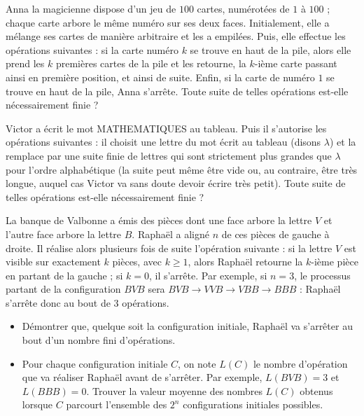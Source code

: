 \begin{exo}
Anna la magicienne dispose d'un jeu de $100$ cartes, numérotées de $1$ à $100$ ; chaque carte arbore le même numéro sur ses deux faces. Initialement, elle a mélange ses cartes de manière arbitraire et les a empilées. Puis, elle effectue les opérations suivantes : si la carte numéro $k$ se trouve en haut de la pile, alors elle prend les $k$ premières cartes de la pile et les retourne, la $k$-ième carte passant ainsi en première position, et ainsi de suite. Enfin, si la carte de numéro $1$ se trouve en haut de la pile, Anna s'arrête. Toute suite de telles opérations est-elle nécessairement finie ?
\end{exo}


\begin{exo}
Victor a écrit le mot MATHEMATIQUES au tableau. Puis il s'autorise les opérations suivantes : il choisit une lettre du mot écrit au tableau (disons $\lambda$) et la remplace par une suite finie de lettres qui sont strictement plus grandes que $\lambda$ pour l'ordre alphabétique (la suite peut même être vide ou, au contraire, être très longue, auquel cas Victor va sans doute devoir écrire très petit). Toute suite de telles opérations est-elle nécessairement finie ?
\end{exo}


\begin{exo}[IMO 2019 P5]
La banque de Valbonne a émis des pièces dont une face arbore la lettre $V$ et l'autre face arbore la lettre $B$. Raphaël a aligné $n$ de ces pièces de gauche à droite. Il réalise alors plusieurs fois de suite l'opération suivante : si la lettre $V$ est visible sur exactement $k$ pièces, avec $k\ge1$, alors Raphaël retourne la $k$-ième pièce en partant de la gauche ; si $k=0$, il s'arrête. Par exemple, si $n=3$, le processus partant de la configuration $BVB$ sera $BVB\rightarrow VVB\rightarrow VBB\rightarrow BBB$ : Raphaël s'arrête donc au bout de $3$ opérations.

\begin{itemize}
\item Démontrer que, quelque soit la configuration initiale, Raphaël va s'arrêter au bout d'un nombre fini d'opérations.
\item Pour chaque configuration initiale $C$, on note $L(C)$ le nombre d'opération que va réaliser Raphaël avant de s'arrêter. Par exemple, $L(BVB)=3$ et $L(BBB)=0$. Trouver la valeur moyenne des nombres $L(C)$ obtenus lorsque $C$ parcourt l'ensemble des $2^n$ configurations initiales possibles.
\end{itemize}
\end{exo}



